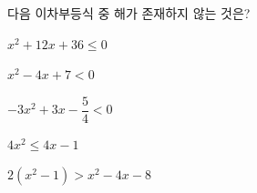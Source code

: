 다음 이차부등식 중 해가 존재하지 않는 것은?
\begin{choicesii}{\rule[-3ex]{0pt}{8ex}$x^2+12x+36\le 0$}{\rule[-3ex]{0pt}{8ex}$x^2-4x+7<0$}{\rule[-3ex]{0pt}{8ex}$-3x^2+3x-\dfrac{5}{4}<0$}{\rule[-3ex]{0pt}{8ex}$4x^2\le 4x-1$}{\rule[-3ex]{0pt}{8ex}$2(x^2-1)>x^2-4x-8$}\end{choicesii}
